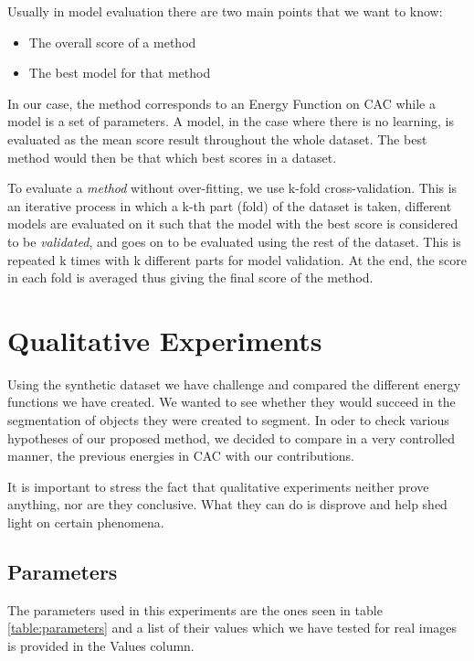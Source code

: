 Usually in model evaluation there are two main points that we want to know:
\begin{itemize}
	\item The overall score of a method
	\item The best model for that method
\end{itemize}

In our case, the method corresponds to an Energy Function on CAC while a model is a set of parameters. 
A model, in the case where there is no learning, is evaluated as the mean score result throughout the whole dataset. The best method would then be that which best scores in a dataset.

To evaluate a \textit{method}  without over-fitting, we use k-fold cross-validation. This is an iterative process in which a k-th part (fold) of the dataset is taken, different models are evaluated on it such that the model with the best score is considered to be \textit{validated}, and goes on to be evaluated using the rest of the dataset. This is repeated k times with k different parts for model validation. At the end, the score in each fold is averaged thus giving the final score of the method.

\section{Qualitative Experiments}
\label{subsec:qualitative_experiments}
Using the synthetic dataset we have challenge and compared the different energy functions we have created. We wanted to see whether they would succeed in the segmentation of objects they were created to segment. 
In oder to check various hypotheses of our proposed method, we decided to compare in a very controlled manner, the previous energies in CAC with our contributions.

It is important to stress the fact that qualitative experiments neither prove anything, nor are they conclusive. What they can do is disprove and help shed light on certain phenomena.

\subsection{Parameters}

The parameters used in this experiments are the ones seen in table \ref{table:parameters} and a list of their values which we have tested for real images is provided in the Values column.

